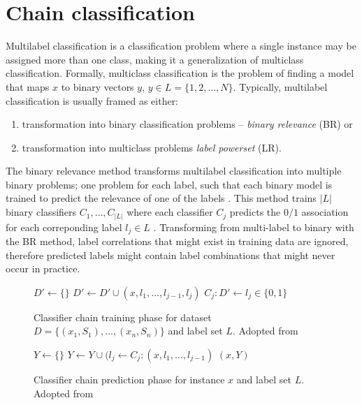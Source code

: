\section{Chain classification}

Multilabel classification is a classification problem where 
a single instance may be assigned more than one class, making it 
a generalization of multiclass classification.
Formally, multiclass classification is the problem of finding 
a model that maps $x$ to binary vectors $y$, $y \in L = \{1, 2, \dots, N\}$. Typically, 
multilabel classification is usually framed as either:
\begin{enumerate}
	\item transformation into binary classification problems -- \textit{binary relevance} (BR) \citep{luaces2012binary} or
	\item transformation into multiclass problems \textit{label powerset} (LR).
\end{enumerate}
The binary relevance method transforms multilabel classification
into multiple binary problems; one problem for each label, such that each
binary model is trained to predict the relevance of one of the labels
\citep{read2011classifier}. This method trains $|L|$ binary classifiers
$C_1, \dots, C_{|L|}$ where each classifier $C_j$ predicts the $0/1$ association
for each correponding label $l_j \in L$ \citep{read2011classifier}.
Transforming from multi-label to binary with the BR method,
label correlations that might exist in training data are ignored, therefore
predicted labels might contain label combinations that might never occur in practice. 

\begin{figure}
\begin{algorithmic}[1]
  \State $D' \gets \{\}$
	  \State $D' \gets D' \cup (x, l_1, \dots, l_{j - 1}, l_j)$
	  \State $C_j: D' \gets l_j \in \{0, 1\}$
	\EndFor
\EndFor
\end{algorithmic}
\caption{Classifier chain training phase for dataset 
	$D = \{(x_1, S_1), \dots, (x_n, S_n)\}$
	and label set $L$.
	Adopted from~\citep{read2011classifier}
	}

\label{alg:train_chain_classifier}
\end{figure}

\begin{figure}
\begin{algorithmic}[1]
\State $Y \gets \{\}$
  \State $Y \gets Y \cup (l_j \gets C_j: (x, l_1, \dots, l_{j - 1})$
\EndFor
\Return $(x, Y)$
\end{algorithmic}
\caption{Classifier chain prediction phase for instance $x$ 
	and label set $L$.
	Adopted from~\citep{read2011classifier}
	}
\label{alg:test_chain_classifier}
\end{figure}

